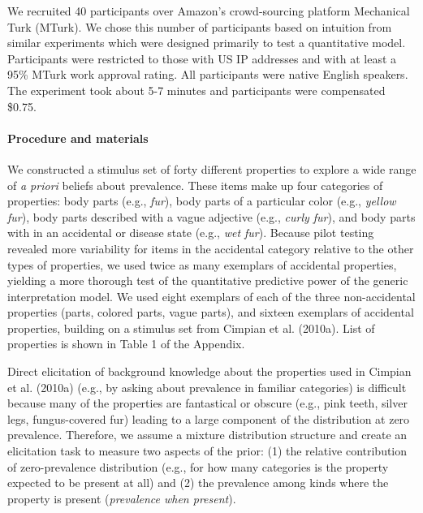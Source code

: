 \documentclass[,man,floatsintext]{apa6}
\let\oldparagraph\paragraph
\renewcommand{\paragraph}[1]{\oldparagraph{#1}\mbox{}}
\theoremstyle{definition}
\theoremstyle{definition}
\theoremstyle{definition}
\theoremstyle{remark}
\begin{document}
We recruited 40 participants over Amazon's crowd-sourcing platform
Mechanical Turk (MTurk). We chose this number of participants based on
intuition from similar experiments which were designed primarily to test
a quantitative model. Participants were restricted to those with US IP
addresses and with at least a 95\% MTurk work approval rating. All
participants were native English speakers. The experiment took about 5-7
minutes and participants were compensated \$0.75.

\hypertarget{procedure-and-materials}{%
\paragraph{Procedure and materials}\label{procedure-and-materials}}

We constructed a stimulus set of forty different properties to explore a
wide range of \emph{a priori} beliefs about prevalence. These items make
up four categories of properties: body parts (e.g., \emph{fur}), body
parts of a particular color (e.g., \emph{yellow fur}), body parts
described with a vague adjective (e.g., \emph{curly fur}), and body
parts with in an accidental or disease state (e.g., \emph{wet fur}).
Because pilot testing revealed more variability for items in the
accidental category relative to the other types of properties, we used
twice as many exemplars of accidental properties, yielding a more
thorough test of the quantitative predictive power of the generic
interpretation model. We used eight exemplars of each of the three
non-accidental properties (parts, colored parts, vague parts), and
sixteen exemplars of accidental properties, building on a stimulus set
from Cimpian et al. (2010a). List of properties is shown in Table 1 of
the Appendix.

Direct elicitation of background knowledge about the properties used in
Cimpian et al. (2010a) (e.g., by asking about prevalence in familiar
categories) is difficult because many of the properties are fantastical
or obscure (e.g., pink teeth, silver legs, fungus-covered fur) leading
to a large component of the distribution at zero prevalence. Therefore,
we assume a mixture distribution structure and create an elicitation
task to measure two aspects of the prior: (1) the relative contribution
of zero-prevalence distribution (e.g., for how many categories is the
property expected to be present at all) and (2) the prevalence among
kinds where the property is present (\emph{prevalence when present}).
\end{document}
